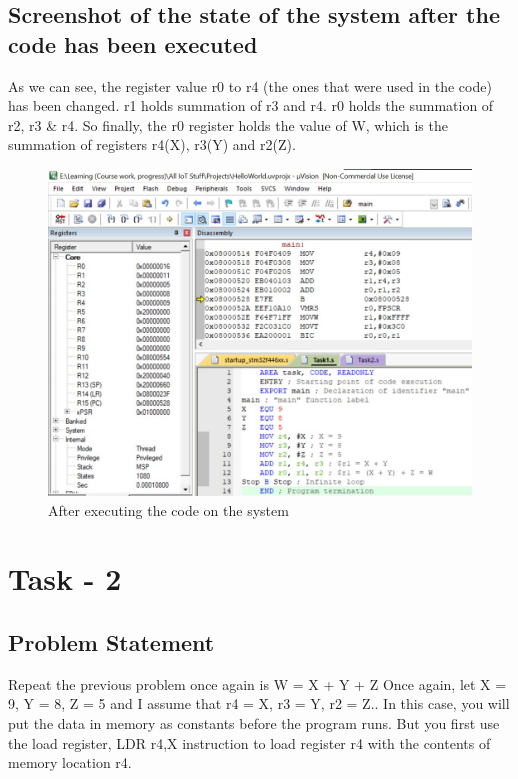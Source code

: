 \documentclass[footheight=20pt, footsepline, headheight=20pt, headsepline]{scrartcl}
\begin{document}
\subsection*{Screenshot of the state of the system after the code has been executed}
As we can see, the register value r0 to r4 (the ones that were used in the code) has been changed. r1 holds summation of r3 and r4. r0 holds the summation of r2, r3 \& r4. So finally, the r0 register holds the value of W, which is the summation of registers r4(X), r3(Y) and r2(Z).
\FloatBarrier
\begin{figure}[ht]
    \centering
    \includegraphics[scale=.8]{images/Task1After1.jpg}
    \caption{After executing the code on the system}
    \label{fig:after_task_one}
\end{figure}


\newpage
\FloatBarrier
\section*{Task - 2}
\subsection*{Problem Statement}
Repeat the previous problem once again is W = X + Y + Z Once again, let X = 9, Y = 8, Z = 5 and I assume that r4 = X, r3 = Y, r2 = Z.. In this case, you will put the data in memory as constants before the program runs. But you first use the load register, LDR r4,X instruction to load register r4 with the contents of
memory location r4.
\end{document}
